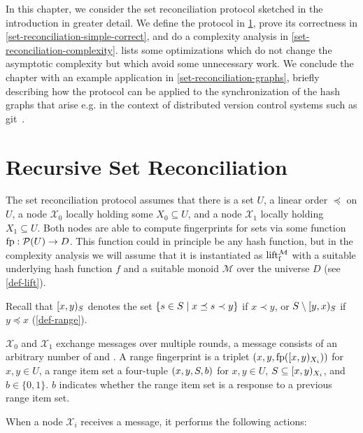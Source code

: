 
In this chapter, we consider the set reconciliation protocol sketched in the introduction in greater detail.
We define the protocol in \cref{set-reconciliation-def}, prove its correctness in \cref{set-reconciliation-simple-correct}, and do a complexity analysis in \cref{set-reconciliation-complexity}.   lists some optimizations which do not change the asymptotic complexity but which avoid some unnecessary work. We conclude the chapter with an example application in \cref{set-reconciliation-graphs}, briefly describing how the protocol can be applied to the synchronization of the hash graphs that arise e.g. in the context of distributed version control systems such as git~\cite{chacon2014pro}.

\section{Recursive Set Reconciliation}
\label{set-reconciliation-def}

The set reconciliation protocol assumes that there is a set $U$, a linear order $\preceq$ on $U$, a node $\mathcal{X}_0$ locally holding some $X_0 \subseteq U$, and a node $\mathcal{X}_1$ locally holding $X_1 \subseteq U$. Both nodes are able to compute fingerprints for sets via some function ${\operatorname{fp}}: {\mathcal{P}({U})} \rightarrow {D}$. This function could in principle be any hash function, but in the complexity analysis we will assume that it is instantiated as $\operatorname{lift_{\operatorname{f}}^{\mathcal{M}}}$ with a suitable underlying hash function $f$ and a suitable monoid $\mathcal{M}$ over the universe $D$ (see \cref{def-lift}).

Recall that $[{x},{y})_{S}$ denotes the set $\{s \in S \mid x \preceq s \prec y\}$ if $x \prec y$, or $S \setminus [{y},{x})_{S}$ if $y \preceq x$ (\cref{def-range}).

$\mathcal{X}_0$ and $\mathcal{X}_1$ exchange messages over multiple rounds, a message consists of an arbitrary number of  and .
A range fingerprint is a triplet $({x}, {y}, {\operatorname{fp}([{x},{y})_{X_i})})$ for $x, y \in U$, a range item set a four-tuple $({x}, {y}, {S}, {b})$ for $x, y \in U$, $S \subseteq [{x},{y})_{X_i}$, and $b \in \{0, 1\}$. $b$ indicates whether the range item set is a response to a previous range item set.

When a node $\mathcal{X}_i$ receives a message, it performs the following actions:

